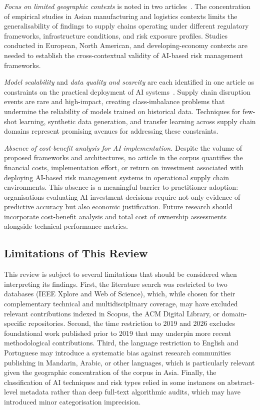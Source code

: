\textit{Focus on limited geographic contexts} is noted in two articles~\cite{yang2025design,nguyen2024federated}. The concentration of empirical studies in Asian manufacturing and logistics contexts limits the generalisability of findings to supply chains operating under different regulatory frameworks, infrastructure conditions, and risk exposure profiles. Studies conducted in European, North American, and developing-economy contexts are needed to establish the cross-contextual validity of AI-based risk management frameworks.

\textit{Model scalability} and \textit{data quality and scarcity} are each identified in one article as constraints on the practical deployment of AI systems~\cite{li2025endtoend,deivaganesh2022future}. Supply chain disruption events are rare and high-impact, creating class-imbalance problems that undermine the reliability of models trained on historical data. Techniques for few-shot learning, synthetic data generation, and transfer learning across supply chain domains represent promising avenues for addressing these constraints.

\textit{Absence of cost-benefit analysis for AI implementation.} Despite the volume of proposed frameworks and architectures, no article in the corpus quantifies the financial costs, implementation effort, or return on investment associated with deploying AI-based risk management systems in operational supply chain environments. This absence is a meaningful barrier to practitioner adoption: organisations evaluating AI investment decisions require not only evidence of predictive accuracy but also economic justification. Future research should incorporate cost-benefit analysis and total cost of ownership assessments alongside technical performance metrics.


\subsection{Limitations of This Review}

This review is subject to several limitations that should be considered when interpreting its findings. First, the literature search was restricted to two databases (IEEE Xplore and Web of Science), which, while chosen for their complementary technical and multidisciplinary coverage, may have excluded relevant contributions indexed in Scopus, the ACM Digital Library, or domain-specific repositories. Second, the time restriction to 2019 and 2026 excludes foundational work published prior to 2019 that may underpin more recent methodological contributions. Third, the language restriction to English and Portuguese may introduce a systematic bias against research communities publishing in Mandarin, Arabic, or other languages, which is particularly relevant given the geographic concentration of the corpus in Asia. Finally, the classification of AI techniques and risk types relied in some instances on abstract-level metadata rather than deep full-text algorithmic audits, which may have introduced minor categorisation imprecision.